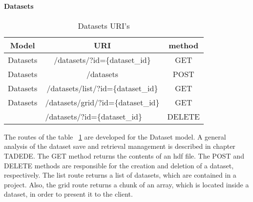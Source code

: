 \paragraph{Datasets}
\begin{table}[]
\centering
\begin{tabular}{|c|c|c|}
\hline
\rowcolor[HTML]{32CB00} 
\textbf{Model}                                         & \textbf{URI}                                                               & \textbf{method}                                     \\ \hline
\rowcolor[HTML]{FFFFFF} 
Datasets                                               & /datasets/?id=\{dataset\_id\}                                              & GET                                                 \\ \hline
\rowcolor[HTML]{67FD9A} 
Datasets                                               & /datasets                                                                  & POST                                                \\ \hline
\rowcolor[HTML]{FFFFFF} 
Datasets                                               & /datasets/list/?id=\{dataset\_id\}                                         & GET                                                 \\ \hline
\rowcolor[HTML]{67FD9A} 
Datasets                                               & /datasets/grid/?id=\{dataset\_id\}                                         & GET                                                 \\ \hline
\rowcolor[HTML]{FFFFFF} 
\multicolumn{1}{|l|}{\cellcolor[HTML]{FFFFFF}Datasets} & \multicolumn{1}{l|}{\cellcolor[HTML]{FFFFFF}/datasets/?id=\{dataset\_id\}} & \multicolumn{1}{l|}{\cellcolor[HTML]{FFFFFF}DELETE} \\ \hline
\end{tabular}
\caption{Datasets URI's}
\label{datasetsURI}
\end{table}
The routes of the table ~\ref{datasetsURI} are developed for the Dataset model. A general analysis of the dataset save and retrieval management is described in chapter TADEDE. The GET method returns the contents of an hdf file. The POST and DELETE methods are responsible for the creation and deletion of a dataset, respectively. The list route returns a list of datasets, which are contained in a project. Also, the grid route returns a chunk of an array, which is located inside a dataset, in order to present it to the client.


